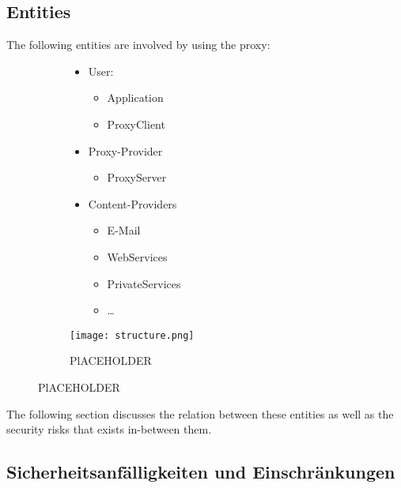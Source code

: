 \documentclass[12pt, a4paper]{scrartcl}
\begin{document}
\subsection{Entities}
The following entities are involved by using the proxy:
\begin{figure}[H]
    \centering
    \begin{subfigure}{0.45\textwidth}
        \begin{itemize}
            \item User:
            \begin{itemize}
                \item Application
                \item ProxyClient
            \end{itemize}
            \item Proxy-Provider
            \begin{itemize}
                \item ProxyServer
            \end{itemize}
            \item Content-Providers
            \begin{itemize}
                \item E-Mail
                \item WebServices
                \item PrivateServices
                \item \ldots
            \end{itemize}
        \end{itemize}
    \end{subfigure}
    \begin{subfigure}{0.5\textwidth}
        \centering
        \texttt{[image: structure.png]}
        \caption{PlACEHOLDER}
        \label{fig::enti}
    \end{subfigure}
\end{figure}

\noindent The following section discusses the relation between these entities as well as the security risks that exists in-between them.
\subsection{Sicherheitsanfälligkeiten und Einschränkungen}
\end{document}
